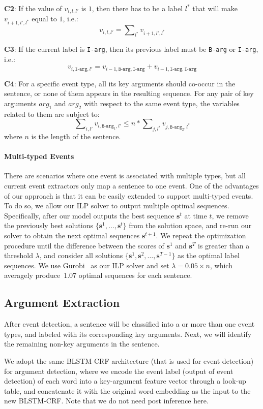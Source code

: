 \textbf{C2}: If the value of $v_{i,l,l'}$ is $1$, then there has to be a label $l^*$ that will make $v_{i+1,l',l^*}$ equal to $1$, i.e.:
\begin{equation}
	v_{i,l,l'} = \sum\nolimits_{l^*}v_{i+1,l',l^*}
\end{equation}

\textbf{C3}: If the current label is \texttt{I-arg}, then its previous label must be \texttt{B-arg} or \texttt{I-arg}, i.e.:
\begin{equation}
	v_{i,\texttt{I-arg},l'} = v_{i-1,\texttt{B-arg},\texttt{I-arg}} + v_{i-1, \texttt{I-arg}, \texttt{I-arg}}
\end{equation}

\textbf{C4}: For a specific event type, all its key arguments should co-occur in the sentence, or none of them appears in the resulting sequence. For any pair of key arguments $arg_1$ and $arg_2$ with respect to the same event type, the variables related to them are subject to:
\begin{equation}
	\sum\nolimits_{i,l'}{v_{i,\texttt{B-arg}_1,l'}} \leq n * \sum\nolimits_{j,l^*}{v_{j,\texttt{B-arg}_2,l^*}}
\end{equation}
where $n$ is the length of the sentence.

\paragraph{Multi-typed Events}
There are scenarios where one event is associated with multiple types, but all current event extractors only map a sentence to one event.
 One of the advantages of our approach is that it can be easily extended to support multi-typed events.
To do so, we allow our ILP solver to output multiple optimal sequences. Specifically, after our model outputs the best sequence $\bm{s}^t$
at time $t$, we remove the previously best solutions
 $\{\bm{s}^1, \ldots, \bm{s}^{t}\}$ from the solution space, and re-run our solver to obtain the next optimal sequences $\bm{s}^{t+1}$.
We repeat the optimization procedure until the difference between the scores of $\bm{s}^1$ and $\bm{s}^T$ is greater
than a threshold $\lambda$, and consider all solutions $\{\bm{s}^1, \bm{s}^2, \ldots, \bm{s}^{T-1}\}$ as the optimal label sequences.
We use Gurobi~\cite{gurobi} as our ILP solver and set $\lambda=0.05 \times n$, which averagely produce~1.07 optimal sequences for each sentence.

\subsection{Argument Extraction}
After event detection, a sentence will be classified into a or more than one event types, and labeled with its corresponding key arguments.
Next, we will identify the remaining non-key arguments in the sentence.

We adopt the same BLSTM-CRF architecture (that is used for event detection) for argument detection, where we encode the event label (output
of event detection) of each word into a key-argument feature vector through a look-up table, and concatenate it with the original word
embedding as the input to the new BLSTM-CRF. Note that we do not need post inference here.
